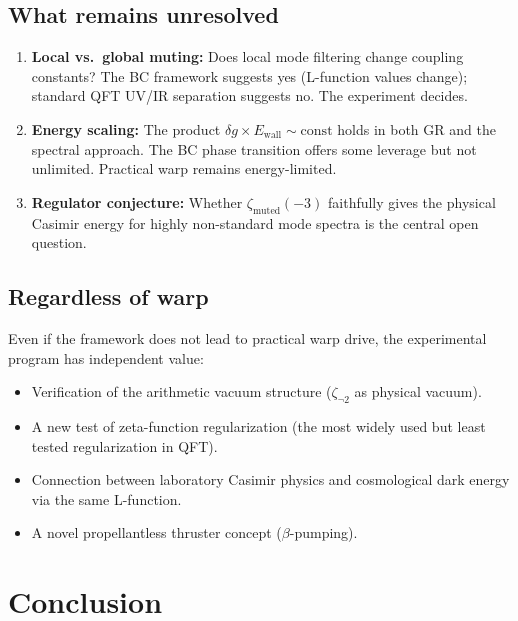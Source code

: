 \documentclass[aps,prd,twocolumn,superscriptaddress,nofootinbib]{revtex4-2}
\begin{document}
\subsection{What remains unresolved}

\begin{enumerate}
\item \textbf{Local vs.\ global muting:}
  Does local mode filtering change coupling constants?
  The BC framework suggests yes (L-function values change);
  standard QFT UV/IR separation suggests no.
  The experiment decides.

\item \textbf{Energy scaling:}
  The product $\delta g \times E_{\mathrm{wall}} \sim \text{const}$
  holds in both GR and the spectral approach.
  The BC phase transition offers some leverage but not unlimited.
  Practical warp remains energy-limited.

\item \textbf{Regulator conjecture:}
  Whether $\zeta_{\mathrm{muted}}(-3)$ faithfully gives the
  physical Casimir energy for highly non-standard mode spectra
  is the central open question.
\end{enumerate}

\subsection{Regardless of warp}

Even if the framework does not lead to practical warp drive,
the experimental program has independent value:
\begin{itemize}
\item Verification of the arithmetic vacuum structure
  ($\zeta_{\neg 2}$ as physical vacuum).
\item A new test of zeta-function regularization
  (the most widely used but least tested regularization in QFT).
\item Connection between laboratory Casimir physics and
  cosmological dark energy via the same L-function.
\item A novel propellantless thruster concept ($\beta$-pumping).
\end{itemize}

\section{Conclusion}
\end{document}
